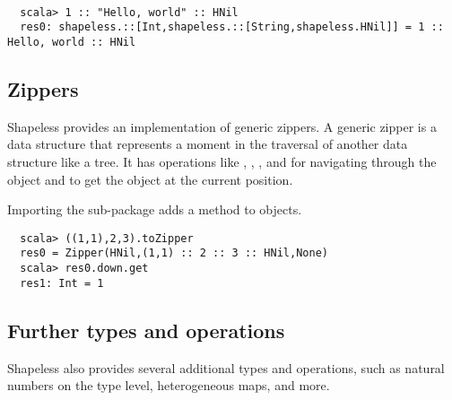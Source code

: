 \begin{example} {\ } %
\begin{lstlisting}
  scala> 1 :: "Hello, world" :: HNil
  res0: shapeless.::[Int,shapeless.::[String,shapeless.HNil]] = 1 :: Hello, world :: HNil
\end{lstlisting}
\end{example}

\subsection{Zippers}
Shapeless provides an implementation of generic zippers. A generic zipper is
a data structure that represents a moment in the traversal of another data
structure like a tree. It has operations like , , ,
and  for navigating through the object and  to get the object
at the current position.

\begin{example}
Importing the  sub-package adds a  method to objects.

\begin{lstlisting}
  scala> ((1,1),2,3).toZipper
  res0 = Zipper(HNil,(1,1) :: 2 :: 3 :: HNil,None)
  scala> res0.down.get
  res1: Int = 1
\end{lstlisting}
\end{example}

\subsection{Further types and operations}
Shapeless also provides several additional types and operations, such as
natural numbers on the type level, heterogeneous maps, and more.
